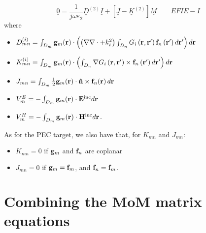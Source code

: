 \begin{equation}\label{eqn:Matrix EFIE-I}
\boxed{\underline{0} =  \frac{1}{j \omega \varepsilon_2}  \underline{\underline{D}}^{(2)} \underline{I}  + \left[\underline{\underline{J}} - \underline{\underline{K}}^{(2)} \right] \underline{M} } \qquad EFIE-I 
\end{equation}
where
\begin{itemize}
\item $D_{mn}^{(i)} = \int_{D_m}\mathbf{g}_m \!\left(\mathbf{r}\right) \cdot \left( \left(\nabla \nabla \cdot + k_i^2\right) \int_{D_n} G_i\left(\mathbf{r}, \mathbf{r}'\right) \mathbf{f}_n\left(\mathbf{r}'\right) d\mathbf{r}' \right) d\mathbf{r}$
\item $K_{mn}^{(i)} = \int_{D_m} \mathbf{g}_m \!\left(\mathbf{r}\right) \cdot \left(\int_{D_n} \nabla G_i\left(\mathbf{r}, \mathbf{r}'\right) \times \mathbf{f}_n\left(\mathbf{r}'\right) d\mathbf{r}'\right) d\mathbf{r}$
\item $J_{mn} = \int_{D_m} \frac{1}{2} \mathbf{g}_m \!\left(\mathbf{r}\right) \cdot \mathbf{\hat{n}} \times \mathbf{f}_{n}\!\left(\mathbf{r}\right)d\mathbf{r}$
\item $V_m^{E} = -\int_{D_m}\mathbf{g}_m \!\left(\mathbf{r}\right) \cdot \mathbf{E}^\text{inc} d\mathbf{r}$
\item $V_m^{H} = -\int_{D_m}\mathbf{g}_m \!\left(\mathbf{r}\right) \cdot \mathbf{H}^\text{inc} d\mathbf{r}$.
\end{itemize}
%
\par
As for the PEC target, we also have that, for $K_{mn}$ and $J_{mn}$:
\begin{itemize}
\item $K_{mn} = 0$ if $\mathbf{g}_m$ and $\mathbf{f}_n$ are coplanar
\item $J_{mn} = 0$ if $\mathbf{g}_m = \mathbf{f}_m$, and $\mathbf{f}_n = \mathbf{f}_m$.
\end{itemize}

\section{Combining the MoM matrix equations}
%
\par
